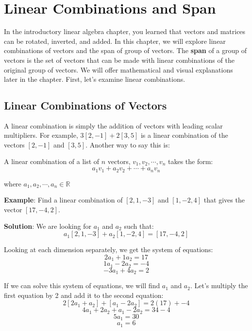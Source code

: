 \chapter{Linear Combinations and Span}

In the introductory linear algebra chapter, you learned that vectors and 
matrices can be rotated, inverted, and added. In this chapter, we will explore 
linear combinations of vectors and the span of group of vectors. The 
\textbf{span} of a group of vectors is the set of vectors that can 
be made with linear combinations of the original group of vectors. We will 
offer mathematical and visual explanations later in the chapter. First, let's 
examine linear combinations. 

\section{Linear Combinations of Vectors}
A linear combination is simply the addition of vectors with leading scalar 
multipliers. For example, $3 \left[ 2, -1 \right] + 2 \left[ 3, 5 \right]$ is 
a linear combination of the vectors $\left[ 2, -1 \right]$ and $\left[ 3, 5 
\right]$. Another way to say this is:

\begin{mdframed}[style = important, frametitle = {Linear Combination of 
Vectors}]
A linear combination of a list of $n$ vectors, $v_1, v_2, \cdots, v_n$ takes 
the form:
$$a_1 v_1 + a_2 v_2 + \cdots + a_n v_n$$

where $a_1, a_2, \cdots, a_n \in \mathbb{R}$
\end{mdframed}

\textbf{Example}: Find a linear combination of $\left[ 2, 1, -3 \right]$ and 
$\left[ 1, -2, 4 \right]$ that gives the vector $\left[ 17, -4, 2 \right]$.

\textbf{Solution}: We are looking for $a_1$ and $a_2$ such that:
$$a_1 \left[ 2, 1, -3 \right] + a_2 \left[ 1, -2, 4 \right] = \left[17, -4, 2 
\right]$$

Looking at each dimension separately, we get the system of equations:
$$2 a_1 + 1 a_2 = 17$$
$$1 a_1 - 2 a_2 = -4$$
$$-3 a_1 + 4 a_2 = 2$$

If we can solve this system of equations, we will find $a_1$ and $a_2$. Let's 
multiply the first equation by 2 and add it to the second equation:
$$2 \left[ 2 a_1 + a_2 \right] + \left[ a_1 - 2 a_2 \right] = 2 \left( 17 
\right) + -4$$
$$4 a_1 + 2 a_2 + a_1 - 2 a_2 = 34 - 4$$
$$5 a_1 = 30$$
$$a_1 = 6$$

